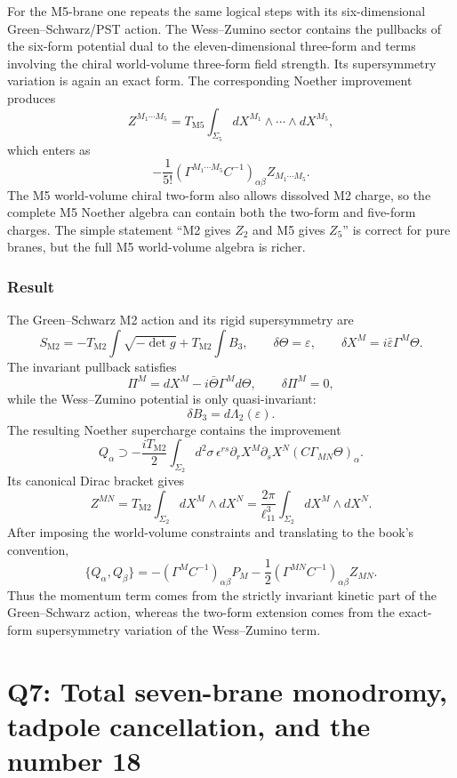 \documentclass[
  10pt,
  a4paper,
  openany]{book}
\begin{document}
For the M5-brane one repeats the same logical steps with its
six-dimensional Green--Schwarz/PST action. The Wess--Zumino sector
contains the pullbacks of the six-form potential dual to the
eleven-dimensional three-form and terms involving the chiral
world-volume three-form field strength. Its supersymmetry variation is
again an exact form. The corresponding Noether improvement produces \[
Z^{M_1\cdots M_5}
=T_{\mathrm{M5}}
\int_{\Sigma_5}
dX^{M_1}\wedge\cdots\wedge dX^{M_5},
\] which enters as \[
-\frac1{5!}
(\Gamma^{M_1\cdots M_5}C^{-1})_{\alpha\beta}
Z_{M_1\cdots M_5}.
\] The M5 world-volume chiral two-form also allows dissolved M2 charge,
so the complete M5 Noether algebra can contain both the two-form and
five-form charges. The simple statement ``M2 gives \(Z_2\) and M5 gives
\(Z_5\)'' is correct for pure branes, but the full M5 world-volume
algebra is richer.

\subsubsection{Result}\label{result-41}

The Green--Schwarz M2 action and its rigid supersymmetry are \[
S_{\mathrm{M2}}
=-T_{\mathrm{M2}}\int\sqrt{-\det g}
+T_{\mathrm{M2}}\int B_3,
\qquad
\delta\Theta=\varepsilon,
\qquad
\delta X^M=i\bar\varepsilon\Gamma^M\Theta.
\] The invariant pullback satisfies \[
\Pi^M=dX^M-i\bar\Theta\Gamma^M d\Theta,
\qquad
\delta\Pi^M=0,
\] while the Wess--Zumino potential is only quasi-invariant: \[
\delta B_3=d\Lambda_2(\varepsilon).
\] The resulting Noether supercharge contains the improvement \[
Q_\alpha\supset
-\frac{iT_{\mathrm{M2}}}{2}
\int_{\Sigma_2}d^2\sigma\,
\epsilon^{rs}\partial_rX^M\partial_sX^N
(C\Gamma_{MN}\Theta)_\alpha.
\] Its canonical Dirac bracket gives \[
\boxed{
Z^{MN}
=T_{\mathrm{M2}}
\int_{\Sigma_2}dX^M\wedge dX^N
=\frac{2\pi}{\ell_{11}^3}
\int_{\Sigma_2}dX^M\wedge dX^N
}.
\] After imposing the world-volume constraints and translating to the
book's convention, \[
\boxed{
\{Q_\alpha,Q_\beta\}
=-(\Gamma^M C^{-1})_{\alpha\beta}P_M
-\frac12
(\Gamma^{MN}C^{-1})_{\alpha\beta}Z_{MN}
}.
\] Thus the momentum term comes from the strictly invariant kinetic part
of the Green--Schwarz action, whereas the two-form extension comes from
the exact-form supersymmetry variation of the Wess--Zumino term.

\section{Q7: Total seven-brane monodromy, tadpole cancellation, and the
number
18}\label{q7-total-seven-brane-monodromy-tadpole-cancellation-and-the-number-18}
\end{document}
